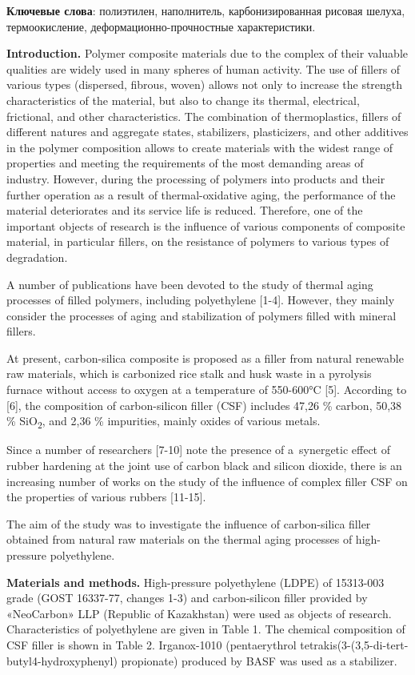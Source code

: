 {\bfseries Ключевые слова}: полиэтилен, наполнитель, карбонизированная
рисовая шелуха, термоокисление, деформационно-прочностные
характеристики.

\begin{multicols}{2}
{\bfseries Introduction.} Polymer composite materials due to the complex of
their valuable qualities are widely used in many spheres of human
activity. The use of fillers of various types (dispersed, fibrous,
woven) allows not only to increase the strength characteristics of the
material, but also to change its thermal, electrical, frictional, and
other characteristics. The combination of thermoplastics, fillers of
different natures and aggregate states, stabilizers, plasticizers, and
other additives in the polymer composition allows to create materials
with the widest range of properties and meeting the requirements of the
most demanding areas of industry. However, during the processing of
polymers into products and their further operation as a result of
thermal-oxidative aging, the performance of the material deteriorates
and its service life is reduced. Therefore, one of the important objects
of research is the influence of various components of composite
material, in particular fillers, on the resistance of polymers to
various types of degradation.

A number of publications have been devoted to the study of thermal aging
processes of filled polymers, including polyethylene {[}1-4{]}. However,
they mainly consider the processes of aging and stabilization of
polymers filled with mineral fillers.

At present, carbon-silica composite is proposed as a filler from natural
renewable raw materials, which is carbonized rice stalk and husk waste
in a pyrolysis furnace without access to oxygen at a temperature of
550-600°C {[}5{]}. According to {[}6{]}, the composition of
carbon-silicon filler (CSF) includes 47,26 \% carbon, 50,38 \%
SiO\textsubscript{2}, and 2,36 \% impurities, mainly oxides of various
metals.

Since a number of researchers {[}7-10{]} note the presence of
a~synergetic effect of rubber hardening at the joint use of carbon black
and silicon dioxide, there is an increasing number of works on the study
of the influence of complex filler CSF on the properties of various
rubbers {[}11-15{]}.

The aim of the study was to investigate the influence of carbon-silica
filler obtained from natural raw materials on the thermal aging
processes of high-pressure polyethylene.

{\bfseries Materials and methods.} High-pressure polyethylene (LDPE) of
15313-003 grade (GOST 16337-77, changes 1-3) and carbon-silicon filler
provided by «NeoCarbon» LLP (Republic of Kazakhstan) were used as
objects of research. Characteristics of polyethylene are given in Table
1. The chemical composition of CSF filler is shown in Table 2.
Irganox-1010 (pentaerythrol
tetrakis(3-(3,5-di-tert-butyl4-hydroxyphenyl) propionate) produced by
BASF was used as a stabilizer.
\end{multicols}

